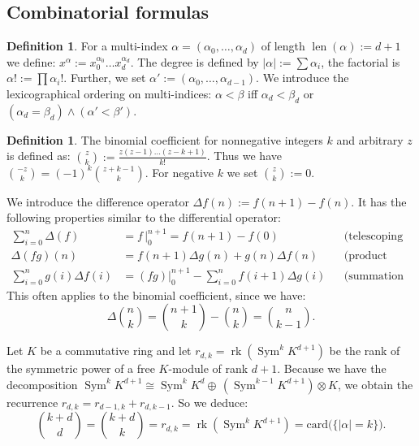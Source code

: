 \documentclass{amsart}
\DeclareMathOperator{\rank}{rk}
\DeclareMathOperator{\Sym}{Sym}
\DeclareMathOperator{\len}{len}
\newcommand{\coloneqq}{:=}
\theoremstyle{plain}
\theoremstyle{definition}
\newtheorem{definition}[theorem]{Definition}
\theoremstyle{remark}
\begin{document}
\subsection{Combinatorial formulas}
\begin{definition}\label{multiindex}
For a multi-index $\alpha=(\alpha_0,\ldots,\alpha_d)$ of length $\len(\alpha)\coloneqq d+1$ we define: $x^\alpha \coloneqq x_0^{\alpha_0}\ldots x_d^{\alpha_d}$. The degree is defined by $|\alpha |\coloneqq\sum\alpha_i$, the factorial is $\alpha! \coloneqq \prod \alpha_i!$. Further, we set
$\alpha'\coloneqq(\alpha_0,\ldots,\alpha_{d-1})$. We introduce the lexicographical ordering on multi-indices: $\alpha < \beta$ iff $\alpha_d < \beta_d$ or $(\alpha_d=\beta_d) \wedge (\alpha'<\beta')$.
\end{definition}
\begin{definition}
The binomial coefficient for nonnegative integers $k$ and arbitrary $z$ is defined as:
$\binom{z}{k} \coloneqq \frac{z(z-1)\ldots(z-k+1)}{k!}$. Thus we have $\binom{-z}{k}=(-1)^k\binom{z+k-1}{k}$. For negative $k$ we set $\binom{z}{k}\coloneqq 0$.
\end{definition}
We introduce the difference operator $\Delta f(n) \coloneqq f(n+1)-f(n)$. It has the following properties similar to the differential operator:
\begin{align}
 \sum_{i=0}^n \Delta(f) & = f\,\Big|_0^{n+1}= f(n+1)-f(0) && \text{(telescoping sum)} \\
 \Delta (fg)(n) &= f(n+1) \Delta g(n) + g(n)\Delta f(n) &&\text{(product rule)} \\
\label{sumbyparts}  \sum_{i=0}^n g(i)\Delta f(i) & = (fg)\Big|_0^{n+1} - \sum_{i=0}^n f(i+1)\Delta g(i) && \text{(summation by parts)}
\end{align}
This often applies to the binomial coefficient, since we have: 
\begin{equation} \label{binomdiff}
\textstyle \Delta \binom{n}{k}=\binom{n+1}{k}-\binom{n}{k} = \binom{n}{k-1}.
\end{equation}

Let $K$ be a commutative ring and let $r_{d,k} = \rank \left(\Sym^k K^{d+1} \right)$ be the rank of the symmetric power of a free $K$-module of rank $d\!+\!1$. 
Because we have the decomposition $\Sym^k\! K^{d+1} \cong \Sym^k\! K^d \oplus \,(\Sym^{k-1}\! K^{d+1})\!\otimes\! K$, we obtain the recurrence $r_{d,k} = r_{d-1,k} +r_{d,k-1}$. So we deduce:
\begin{equation} \label{binomcount} \textstyle
\binom{k+d}{d} =\binom{k+d}{k} = r_{d,k}=\rank \left(\Sym^k K^{d+1} \right) = \text{card}\big(\{|\alpha| =k\}\big).
\end{equation}
\end{document}
